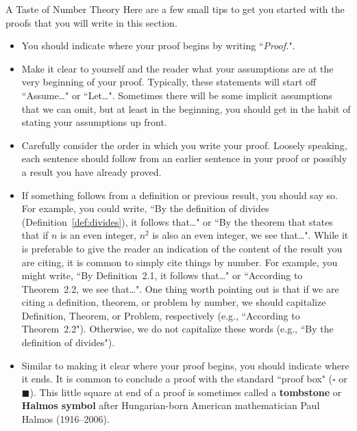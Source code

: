 \begin{section}{A Taste of Number Theory}
Here are a few small tips to get you started with the proofs that you will write in this section.
\begin{itemize}
\item You should indicate where your proof begins by writing ``\emph{Proof.}".
\item Make it clear to yourself and the reader what your assumptions are at the very beginning of your proof. Typically, these statements will start off ``Assume\ldots" or ``Let\ldots". Sometimes there will be some implicit assumptions that we can omit, but at least in the beginning, you should get in the habit of stating your assumptions up front. 
\item Carefully consider the order in which you write your proof. Loosely speaking, each sentence should follow from an earlier sentence in your proof or possibly a result you have already proved.
\item If something follows from a definition or previous result, you should say so.  For example, you could write, ``By the definition of divides (Definition~\ref{def:divides}), it follows that\ldots" or ``By the theorem that states that if $n$ is an even integer, $n^2$ is also an even integer, we see that\ldots". While it is preferable to give the reader an indication of the content of the result you are citing, it is common to simply cite things by number. For example, you might write, ``By Definition~2.1, it follows that\ldots" or ``According to Theorem~2.2, we see that\ldots".  One thing worth pointing out is that if we are citing a definition, theorem, or problem by number, we should capitalize Definition, Theorem, or Problem, respectively (e.g., ``According to Theorem~2.2"). Otherwise, we do not capitalize these words (e.g., ``By the definition of divides").
\item Similar to making it clear where your proof begins, you should indicate where it ends.  It is common to conclude a proof with the standard ``proof box" ($\square$ or $\blacksquare$).  This little square at end of a proof is sometimes called a \textbf{tombstone} or \textbf{Halmos symbol} after Hungarian-born American mathematician Paul Halmos (1916--2006).
\end{itemize}


\end{section}
